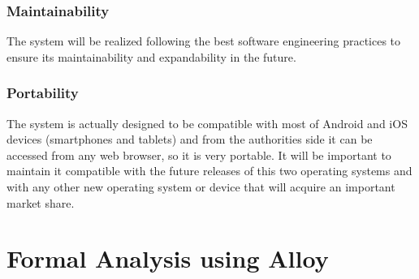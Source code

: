 \documentclass[a4paper]{report}
\begin{document}
\subsection{Maintainability}
The system will be realized following the best software engineering practices to ensure its maintainability and expandability in the future.
\subsection{Portability}
The system is actually designed to be compatible with most of Android and iOS devices (smartphones and tablets) and from the authorities side it can be accessed from any web browser, so it is very portable.
It will be important to maintain it compatible with the future releases of this two operating systems and with any other new operating system or device that will acquire an important market share.
\chapter{Formal Analysis using Alloy}
\end{document}
